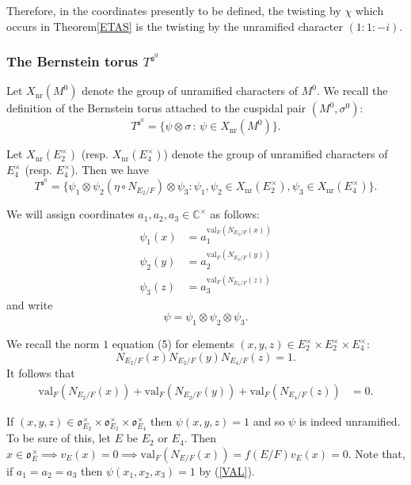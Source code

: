 \documentclass[11pt]{amsart}
\theoremstyle{remark}
\theoremstyle{definition}
\def\fo{\mathfrak{o}}
\newcommand{\C}{\mathbb{C}}
\newcommand{\nr}{\mathrm{nr}}
\def\val{\mathrm{val}}
\newcommand{\fs}{\mathfrak{s}}
\begin{document}
Therefore, in the coordinates presently to be defined, the twisting by $\chi$ which occurs in Theorem\ref{ETAS} 
is the twisting by the unramified character $(1 : 1: -i)$.


\subsubsection{The Bernstein torus $T^{\fs^0}$}   Let $X_{\nr}(M^0)$ denote the group of unramified characters of $M^0$.   We recall the definition of the Bernstein torus attached to the cuspidal pair
$(M^0, \sigma^0)$:
\[
T^{\fs^0} = \{\psi \otimes \sigma \,:\, \psi \in X_{\nr}(M^0)\}.   
\]

Let $X_{\nr}(E_2^{\times})$ (resp. $X_{\nr}(E_4^\times)$) denote the group of unramified characters of $E_4^\times$ (resp. $E_4^\times$).   Then we have
\[
T^{\fs^0} = \{\psi_1 \otimes \psi_2 ( \eta \circ N_{E_2/F}) \otimes \psi_3\colon \psi_1, \psi_2  \in X_{\nr}(E_2^\times), \psi_3 \in X_{\nr}(E_4^\times) \}.
\]

We will assign coordinates $a_1, a_2, a_3 \in \C^\times$ as follows:
\begin{align*}
\psi_1(x) &= a_1^{\val_F (N_{E_2/F}(x))}\\
\psi_2(y) &= a_2^{\val_F (N_{E_2/F}(y))}\\
\psi_3(z) &= a_3^{\val_F (N_{E_4/F}(z))}
\end{align*}
and write 
\[
\psi = \psi_1 \otimes \psi_2 \otimes \psi_3.
\]

  We recall the norm $1$ equation (5) for elements $(x,y,z) \in E_2^\times \times E_2^\times \times E_4^\times$:
\[
N_{E_2/F}(x) N_{E_2/F}(y) N_{E_4/F}(z) = 1.
\]
It follows that 
\begin{align}\label{VAL}
\val_F (N_{E_2/F}(x)) + \val_F( N_{E_2/F}(y)) + \val_F( N_{E_4/F}(z) ) &= 0.
\end{align}




If $(x, y, z) \in \fo_{E_2}^\times \times \fo_{E_2}^\times \times \fo_{E_4}^\times$ then $\psi(x, y, z) = 1$ and so $\psi$ is indeed unramified.   To be sure of this,
let $E$ be $E_2$ or $E_4$.   Then $x \in \fo_E^\times \implies v_E(x) = 0 \implies \val_F(N_{E/F}(x)) = f(E/F)v_E(x) = 0$.   
Note that, if $a_1 = a_2 = a_3$ then $\psi(x_1, x_2, x_3) = 1$ by (\ref{VAL}).  
 
\end{document}
